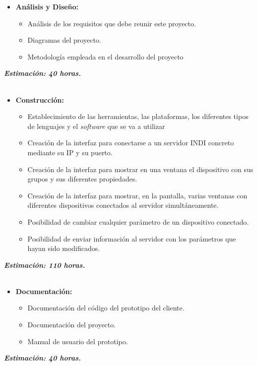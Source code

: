 \begin{itemize}
  \item \textbf{Análisis y Diseño:}
  \begin{itemize}
    \item Análisis de los requisitos que debe reunir este proyecto.
    \item Diagramas del proyecto.
    \item Metodología empleada en el desarrollo del proyecto
  \end{itemize}
\end{itemize}
\textit{\textbf{Estimación: 40 horas.}}\\ \\

\begin{itemize}
  \item \textbf{Construcción:}
  \begin{itemize}
    \item Establecimiento de las herramientas, las plataformas, los diferentes tipos de lenguajes y el \textit{software} que se va a utilizar
    \item Creación de la interfaz para conectarse a un servidor INDI concreto mediante su IP y su puerto.
    \item Creación de la interfaz para mostrar en una ventana el dispositivo con sus grupos y sus diferentes propiedades.
    \item Creación de la interfaz para mostrar, en la pantalla, varias ventanas con diferentes dispositivos conectados al servidor simultáneamente.
    \item Posibilidad de cambiar cualquier parámetro de un dispositivo conectado.
    \item Posibilidad de enviar información al servidor con los parámetros que hayan sido modificados.
  \end{itemize}
\end{itemize}
\textit{\textbf{Estimación: 110 horas.}}\\ \\

\begin{itemize}
  \item \textbf{Documentación:}
  \begin{itemize}
    \item Documentación del código del prototipo del cliente.
    \item Documentación del proyecto.
    \item Manual de usuario del prototipo.
  \end{itemize}
\end{itemize}
\textit{\textbf{Estimación: 40 horas.}}


